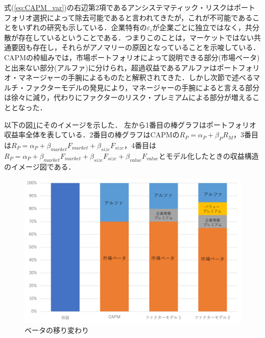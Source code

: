 \documentclass[11pt]{jreport}
\begin{document}
式(\ref{eq:CAPM_var})の右辺第2項であるアンシステマティック・リスクはポートフォリオ選択によって除去可能であると言われてきたが，これが不可能であることをいずれの研究も示している．企業特有の$\varepsilon_i$が企業ごとに独立ではなく，共分散が存在しているということである．つまりこのことは，マーケットではない共通要因も存在し，それらがアノマリーの原因となっていることを示唆している．CAPMの枠組みでは，市場ポートフォリオによって説明できる部分(市場ベータ)と出来ない部分(アルファ)に分けられ，超過収益であるアルファはポートフォリオ・マネージャーの手腕によるものたと解釈されてきた．しかし次節で述べるマルチ・ファクターモデルの発見により，マネージャーの手腕によると言える部分は徐々に減り，代わりにファクターのリスク・プレミアムによる部分が増えることとなった．

以下の図\ref{fig:beta}にそのイメージを示した．
左から1番目の棒グラフはポートフォリオ収益率全体を表している．2番目の棒グラフはCAPMの$R_P=\alpha_P + \beta_PR_M$，3番目は$R_P = \alpha_P + \beta_{market}F_{market} + \beta_{size}F_{size}$，4番目は$R_P = \alpha_P + \beta_{market}F_{market} + \beta_{size}F_{size} + \beta_{value}F_{value}$とモデル化したときの収益構造のイメージ図である．

\begin{figure}[H]
	\begin{center}
		\includegraphics[width=14cm]{./fig/beta}
		\caption{ベータの移り変わり}
		\label{fig:beta}
	\end{center}
\end{figure}
\end{document}
